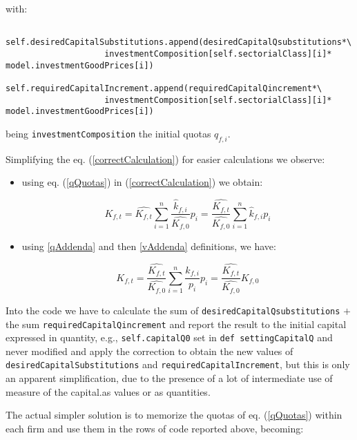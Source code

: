 \documentclass[]{amsart} %
\begin{document}
with:
\scriptsize
\begin{verbatim}
            self.desiredCapitalSubstitutions.append(desiredCapitalQsubstitutions*\
                    investmentComposition[self.sectorialClass][i]* model.investmentGoodPrices[i])
            self.requiredCapitalIncrement.append(requiredCapitalQincrement*\
                    investmentComposition[self.sectorialClass][i]* model.investmentGoodPrices[i])
\end{verbatim}
\normalsize

being \verb|investmentComposition| the initial quotas $q_{f,i}$.

Simplifying the eq. (\ref{correctCalculation}) for easier calculations we observe:

\begin{itemize}

\item using eq. (\ref{qQuotas}) in (\ref{correctCalculation}) we obtain:

\begin{equation}
K_{f,t}= \hat{K_{f,t}} \sum_{i=1}^{n}  \frac{\hat{k}_{f,i} }{\hat{K_{f,0}}} p_i = \frac{\hat{K_{f,t}}}{\hat{K_{f,0}}} \sum_{i=1}^{n}  \hat{k}_{f,i}  p_i
\label{firstSimp}
\end {equation}

\item using \ref{qAddenda} and then \ref{vAddenda} definitions, we have:

\begin{equation}
K_{f,t}= \frac{\hat{K_{f,t}}}{\hat{K_{f,0}}} \sum_{i=1}^{n}   \frac{k_{f,i}}{p_i}   p_i = \frac{\hat{K_{f,t}}}{\hat{K_{f,0}}} K_{f,0}
\label{secondSimp}
\end {equation}

\end{itemize}

Into the code we have to calculate the sum of \verb|desiredCapitalQsubstitutions| $+$ the sum \verb|requiredCapitalQincrement| and report the result to the initial capital expressed in quantity, e.g., \verb|self.capitalQ0| set in \verb|def settingCapitalQ| and never modified and apply the correction to obtain the new values of \verb|desiredCapitalSubstitutions| and \verb|requiredCapitalIncrement|, but this is only an apparent simplification, due to the presence of a lot of intermediate use of measure of the capital.as values or as quantities.

The actual simpler solution is to memorize the quotas of eq. (\ref{qQuotas}) within each firm and use them in the rows of code reported above, becoming:
\end{document}
